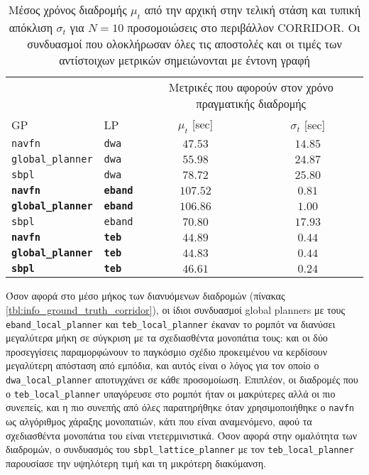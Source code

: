 \begin{table}[h]
\renewcommand{\arraystretch}{1.3}
\begin{tabular}{llcc}
  & & \multicolumn{2}{c}{Μετρικές που αφορούν στον χρόνο πραγματικής διαδρομής} \\
  \cline{3-4}
  GP & LP & $\mu_{t}$ [sec] & $\sigma_{t}$ [sec] \\ \toprule
  \texttt{navfn} & \texttt{dwa} & $47.53$ & $14.85$ \\
  \texttt{global\_planner} & \texttt{dwa} & $55.98$ & $24.87$ \\
  \texttt{sbpl} & \texttt{dwa} & $78.72$ & $25.80$ \\
  \textbf{\texttt{navfn}} & \textbf{\texttt{eband}} & $\bm{107.52}$ & $\bm{0.81}$ \\
  \textbf{\texttt{global\_planner}} & \textbf{\texttt{eband}} & $\bm{106.86}$ & $\bm{1.00}$ \\
  \texttt{sbpl} & \texttt{eband} & $70.80$ & $17.93$ \\
  \textbf{\texttt{navfn}} & \textbf{\texttt{teb}} & $\bm{44.89}$ & $\bm{0.44}$ \\
  \textbf{\texttt{global\_planner}} & \textbf{\texttt{teb}} & $\bm{44.83}$ & $\bm{0.44}$ \\
  \textbf{\texttt{sbpl}} & \textbf{\texttt{teb}} & $\bm{46.61}$ & $\bm{0.24}$ \\ \bottomrule
\end{tabular}
\caption{\small Μέσος χρόνος διαδρομής $\mu_{t}$ από την αρχική στην τελική
         στάση και τυπική απόκλιση $\sigma_{t}$ για $N=10$ προσομοιώσεις στο
         περιβάλλον CORRIDOR. Οι συνδυασμοί που ολοκλήρωσαν όλες τις αποστολές
         και οι τιμές των αντίστοιχων μετρικών σημειώνονται με έντονη γραφή}
\label{tbl:info_pose_corridor}
\end{table}


Όσον αφορά στο μέσο μήκος των διανυόμενων διαδρομών
(πίνακας \ref{tbl:info_ground_truth_corridor}), οι ίδιοι συνδυασμοί global
planners με τους \texttt{eband\_local\_planner} και
\texttt{teb\_local\_planner} έκαναν το ρομπότ να διανύσει μεγαλύτερα μήκη σε
σύγκριση με τα σχεδιασθέντα μονοπάτια τους: και οι δύο προσεγγίσεις
παραμορφώνουν το παγκόσμιο σχέδιο προκειμένου να κερδίσουν μεγαλύτερη απόσταση
από εμπόδια, και αυτός είναι ο λόγος για τον οποίο ο
\texttt{dwa\_local\_planner} αποτυγχάνει σε κάθε προσομοίωση. Επιπλέον, οι
διαδρομές που ο \texttt{teb\_local\_planner} υπαγόρευσε στο ρομπότ ήταν οι
μακρύτερες αλλά οι πιο συνεπείς, και η πιο συνεπής από όλες παρατηρήθηκε όταν
χρησιμοποιήθηκε ο \texttt{navfn} ως αλγόριθμος χάραξης μονοπατιών, κάτι που
είναι αναμενόμενο, αφού τα σχεδιασθέντα μονοπάτια του είναι ντετερμινιστικά.
Όσον αφορά στην ομαλότητα των διαδρομών, ο συνδυασμός του
\texttt{sbpl\_lattice\_planner} με τον \texttt{teb\_local\_planner} παρουσίασε
την υψηλότερη τιμή και τη μικρότερη διακύμανση.


